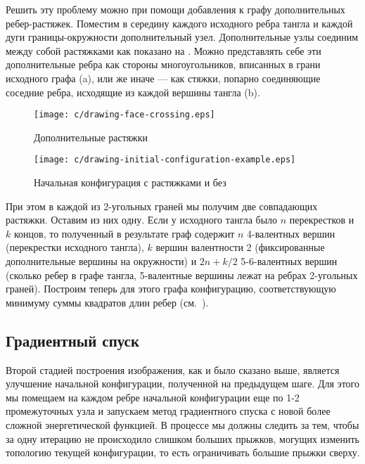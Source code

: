 	Решить эту проблему можно при помощи добавления к графу дополнительных ребер-растяжек. Поместим в середину
	каждого исходного ребра тангла и каждой дуги границы-окружности дополнительный узел. Дополнительные узлы
	соединим между собой растяжками как показано на . Можно представлять себе эти
	дополнительные ребра как стороны многоугольников, вписанных в грани исходного графа
	(a), или же иначе --- как стяжки, попарно соединяющие соседние ребра, исходящие
	из каждой вершины тангла (b).

	\begin{figure}[ht]
		\centering
		\texttt{[image: c/drawing-face-crossing.eps]}
		\caption{Дополнительные растяжки\label{figure:extra-elastic}}
	\end{figure}

	\begin{figure}[ht]
		\centering
		\texttt{[image: c/drawing-initial-configuration-example.eps]}
		\caption{Начальная конфигурация с растяжками и без\label{figure:startconfig}}
	\end{figure}

	При этом в каждой из 2-угольных граней мы получим две совпадающих растяжки. Оставим из них одну. Если у исходного
	тангла было $n$ перекрестков и $k$ концов, то полученный в результате граф содержит $n$ 4-валентных вершин
	(перекрестки исходного тангла), $k$ вершин валентности 2 (фиксированные дополнительные вершины на окружности)
	и $2n + k/2$ 5-6-валентных вершин (сколько ребер в графе тангла, 5-валентные вершины лежат на ребрах 2-угольных
	граней). Построим теперь для этого графа конфигурацию, соответствующую минимуму суммы квадратов длин ребер
	(см.~).

	\subsection{Градиентный спуск}

	Второй стадией построения изображения, как и было сказано выше, является улучшение начальной конфигурации, полученной на
	предыдущем шаге. Для этого мы помещаем на каждом ребре начальной конфигурации еще по 1-2 промежуточных узла и запускаем
	метод градиентного спуска с новой более сложной энергетической функцией. В процессе мы должны следить за тем, чтобы за
	одну итерацию не происходило слишком больших прыжков, могущих изменить топологию текущей конфигурации, то есть ограничивать
	большие прыжки сверху.

